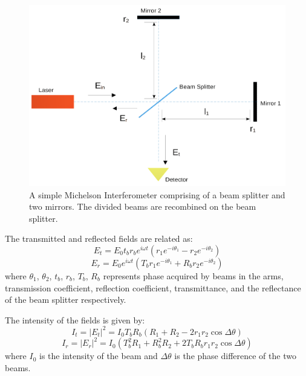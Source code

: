 \documentclass[conference]{IEEEtran}
\begin{document}
\begin{figure}[htbp]
\centerline{\includegraphics[scale=0.15]{interferometer.png}}
\caption{A simple Michelson Interferometer comprising of a beam splitter and two mirrors. The divided beams are recombined on the beam splitter.}

\end{figure}

The transmitted and reflected fields are related as:
\begin{equation}
E_{t} = E_{0}t_{b}r_{b}e^{i\omega t}(r_{1}e^{-i\theta_{1}}-r_{2}e^{-i\theta_{2}}) 
\end{equation}
\begin{equation}
E_{r} = E_{0}e^{i\omega t}(T_{b}r_{1}e^{-i\theta_{1}}+R_{b}r_{2}e^{-i\theta_{2}}) 
\end{equation}
where $\theta_{1}$, $\theta_{2}$, $t_{b}$, $r_{b}$, $T_{b}$, $R_{b}$ represents phase acquired by beams in the arms, transmission coefficient, reflection coefficient, transmittance, and the reflectance of the beam splitter respectively. 

The intensity of the fields is given by:
\begin{equation}
I_{t} = |E_{t}|^2 = I_{0}T_{b}R_{b}(R_{1}+R_{2}-2r_{1}r_{2}\cos{\Delta \theta}) 
\end{equation}
\begin{equation}
I_{r} = |E_{r}|^2 = I_{0}(T_{b}^{2}R_{1} + R_{b}^{2}R_{2}+2T_{b}R_{b}r_{1}r_{2}\cos{\Delta \theta})
\end{equation}
where $I_{0}$ is the intensity of the beam and $\Delta \theta$ is the phase difference of the two beams.
\end{document}

